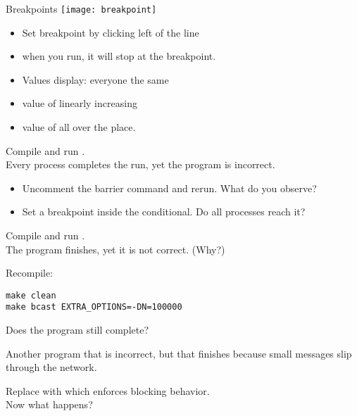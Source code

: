 \documentclass[11pt,headernav]{beamer}
\begin{document}
\begin{frame}[containsverbatim]{Breakpoints}
  \texttt{[image: breakpoint]}
  \begin{itemize}
  \item Set breakpoint by clicking left of the line
  \item when you run, it will stop at the breakpoint.
  \end{itemize}

  \begin{itemize}
  \item Values display: everyone the same 
  \item value of  linearly increasing
  \item value of  all over the place.
  \end{itemize}
\end{frame}

\begin{exerciseframe}[finalize]
  Compile and run .\\
  Every process completes the run, yet the program is incorrect.
  \begin{itemize}
  \item Uncomment the barrier command and rerun. What do you observe?
  \item Set a breakpoint inside the conditional. Do all processes reach it?
  \end{itemize}
\end{exerciseframe}

\begin{exerciseframe}[bcast]
  Compile and run .\\
  The program finishes, yet it is not correct. (Why?)

  Recompile:
\begin{verbatim}
make clean
make bcast EXTRA_OPTIONS=-DN=100000
\end{verbatim}
  Does the program still complete?
\end{exerciseframe}

\begin{exerciseframe}[sendrecv1]
  Another program that is incorrect, but that
  finishes because small messages slip through the network.

  Replace  with  which enforces blocking behavior.\\
  Now what happens?
\end{exerciseframe}
\end{document}
